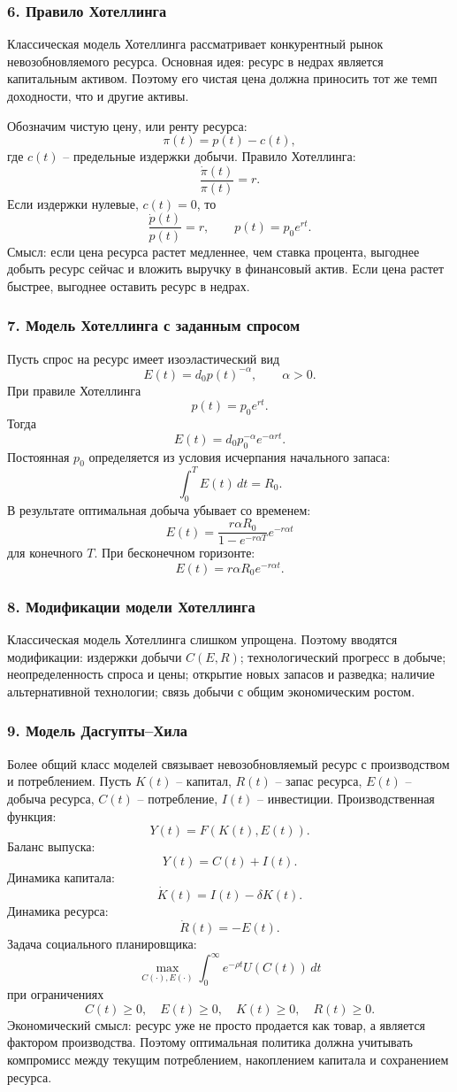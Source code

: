 \documentclass[12pt,a4paper]{article}
\begin{document}
\subsubsection*{6. Правило Хотеллинга}
Классическая модель Хотеллинга рассматривает конкурентный рынок невозобновляемого ресурса. Основная идея: ресурс в недрах является капитальным активом. Поэтому его чистая цена должна приносить тот же темп доходности, что и другие активы.

Обозначим чистую цену, или ренту ресурса:
\[
\pi(t)=p(t)-c(t),
\]
где $c(t)$ -- предельные издержки добычи. Правило Хотеллинга:
\[
\frac{\dot\pi(t)}{\pi(t)}=r.
\]
Если издержки нулевые, $c(t)=0$, то
\[
\frac{\dot p(t)}{p(t)}=r,
\qquad
p(t)=p_0e^{rt}.
\]
Смысл: если цена ресурса растет медленнее, чем ставка процента, выгоднее добыть ресурс сейчас и вложить выручку в финансовый актив. Если цена растет быстрее, выгоднее оставить ресурс в недрах.

\subsubsection*{7. Модель Хотеллинга с заданным спросом}
Пусть спрос на ресурс имеет изоэластический вид
\[
E(t)=d_0p(t)^{-\alpha},\qquad \alpha>0.
\]
При правиле Хотеллинга
\[
p(t)=p_0e^{rt}.
\]
Тогда
\[
E(t)=d_0p_0^{-\alpha}e^{-\alpha rt}.
\]
Постоянная $p_0$ определяется из условия исчерпания начального запаса:
\[
\int_0^T E(t)\,dt=R_0.
\]
В результате оптимальная добыча убывает со временем:
\[
E(t)=\frac{r\alpha R_0}{1-e^{-r\alpha T}}e^{-r\alpha t}
\]
для конечного $T$. При бесконечном горизонте:
\[
E(t)=r\alpha R_0e^{-r\alpha t}.
\]

\subsubsection*{8. Модификации модели Хотеллинга}
Классическая модель Хотеллинга слишком упрощена. Поэтому вводятся модификации: издержки добычи $C(E,R)$; технологический прогресс в добыче; неопределенность спроса и цены; открытие новых запасов и разведка; наличие альтернативной технологии; связь добычи с общим экономическим ростом.

\subsubsection*{9. Модель Дасгупты--Хила}
Более общий класс моделей связывает невозобновляемый ресурс с производством и потреблением. Пусть $K(t)$ -- капитал, $R(t)$ -- запас ресурса, $E(t)$ -- добыча ресурса, $C(t)$ -- потребление, $I(t)$ -- инвестиции. Производственная функция:
\[
Y(t)=F(K(t),E(t)).
\]
Баланс выпуска:
\[
Y(t)=C(t)+I(t).
\]
Динамика капитала:
\[
\dot K(t)=I(t)-\delta K(t).
\]
Динамика ресурса:
\[
\dot R(t)=-E(t).
\]
Задача социального планировщика:
\[
\max_{C(\cdot),E(\cdot)}\int_0^\infty e^{-\rho t}U(C(t))\,dt
\]
при ограничениях
\[
C(t)\ge 0,
\quad
E(t)\ge 0,
\quad
K(t)\ge 0,
\quad
R(t)\ge 0.
\]
Экономический смысл: ресурс уже не просто продается как товар, а является фактором производства. Поэтому оптимальная политика должна учитывать компромисс между текущим потреблением, накоплением капитала и сохранением ресурса.
\end{document}
